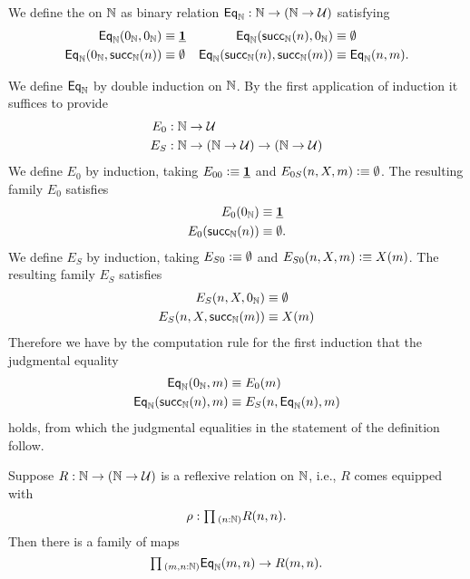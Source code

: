 \begin{defn}\label{defn:obs_nat}
We define the  on ${\mathbb{N}}$ as binary relation $\mathsf{Eq}_{{\mathbb{N}}}:{\mathbb{N}}\to({\mathbb{N}}\to\mathcal{U})$ satisfying
\begin{align*}
\mathsf{Eq}_{{\mathbb{N}}}(0_{{\mathbb{N}}},0_{{\mathbb{N}}}) & \equiv \underline{\mathbf{1}} & \mathsf{Eq}_{{\mathbb{N}}}(\mathsf{succ}_{{\mathbb{N}}}(n),0_{{\mathbb{N}}}) & \equiv \emptyset \\
\mathsf{Eq}_{{\mathbb{N}}}(0_{{\mathbb{N}}},\mathsf{succ}_{{\mathbb{N}}}(n)) & \equiv \emptyset & \mathsf{Eq}_{{\mathbb{N}}}(\mathsf{succ}_{{\mathbb{N}}}(n),\mathsf{succ}_{{\mathbb{N}}}(m)) & \equiv \mathsf{Eq}_{{\mathbb{N}}}(n,m).
\end{align*}
\end{defn}

\begin{constr}
We define $\mathsf{Eq}_{{\mathbb{N}}}$ by double induction on ${\mathbb{N}}$. By the first application of induction it suffices to provide
\begin{align*}
E_0 & : {\mathbb{N}}\to\mathcal{U} \\
E_S & : {\mathbb{N}}\to ({\mathbb{N}}\to\mathcal{U})\to({\mathbb{N}}\to\mathcal{U})
\end{align*}
We define $E_0$ by induction, taking $E_{00}\vcentcolon\equiv \underline{\mathbf{1}}$ and $E_{0S}(n,X,m)\vcentcolon\equiv \emptyset$. The resulting family $E_0$ satisfies
\begin{align*}
E_0(0_{{\mathbb{N}}}) & \equiv \underline{\mathbf{1}} \\
E_0(\mathsf{succ}_{{\mathbb{N}}}(n)) & \equiv \emptyset.
\end{align*} 
We define $E_S$ by induction, taking $E_{S0}\vcentcolon\equiv \emptyset$ and $E_{S0}(n,X,m)\vcentcolon\equiv X(m)$. The resulting family $E_S$ satisfies
\begin{align*}
E_S(n,X,0_{{\mathbb{N}}}) & \equiv \emptyset \\
E_S(n,X,\mathsf{succ}_{{\mathbb{N}}}(m)) & \equiv X(m) 
\end{align*}
Therefore we have by the computation rule for the first induction that the judgmental equality
\begin{align*}
\mathsf{Eq}_{{\mathbb{N}}}(0_{{\mathbb{N}}},m) & \equiv E_0(m) \\
\mathsf{Eq}_{{\mathbb{N}}}(\mathsf{succ}_{{\mathbb{N}}}(n),m) & \equiv E_S(n,\mathsf{Eq}_{{\mathbb{N}}}(n),m)
\end{align*}
holds, from which the judgmental equalities in the statement of the definition follow.
\end{constr}

\begin{lem}\label{ex:obs_nat_least}
  Suppose $R:{\mathbb{N}}\to({\mathbb{N}}\to\mathcal{U})$ is a reflexive relation on ${\mathbb{N}}$, i.e., $R$ comes equipped with
  \begin{equation*}
    \rho : \prd{n:\N}R(n,n).
  \end{equation*}
  Then there is a family of maps
  \begin{equation*}
    \prd{m,n:\N}\EqN(m,n)\to R(m,n).
  \end{equation*}
\end{lem}


